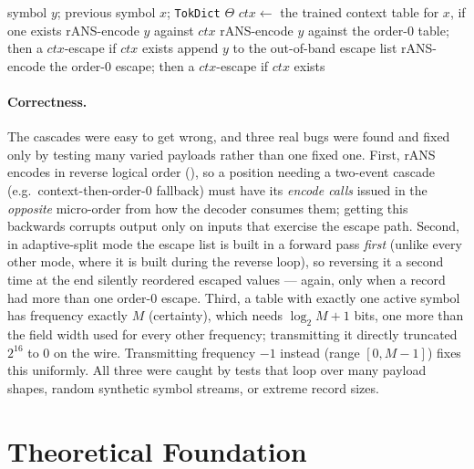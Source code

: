 \documentclass[10pt,twocolumn]{article}
\theoremstyle{plain}
\theoremstyle{definition}
\begin{document}
\begin{algorithm}[t]
\caption{\texttt{TokDict} order-1 $\to$ order-0 $\to$ escape cascade (encode one symbol)}
\label{alg:tokdict-cascade}
\begin{algorithmic}[1]
\Require symbol $y$; previous symbol $x$; \texttt{TokDict} $\Theta$
\State $ctx \gets$ the trained context table for $x$, if one exists
    \State rANS-encode $y$ against $ctx$ 
    \State rANS-encode $y$ against the order-0 table; then a $ctx$-escape if $ctx$ exists
\Else
    \State append $y$ to the out-of-band escape list
    \State rANS-encode the order-0 escape; then a $ctx$-escape if $ctx$ exists
\EndIf
\State {}
\end{algorithmic}
\end{algorithm}

\paragraph{Correctness.} The cascades were easy to get wrong, and three real bugs
were found and fixed only by testing many varied payloads rather than one fixed one.
First, rANS encodes in reverse logical order (), so a position needing
a two-event cascade (e.g.\ context-then-order-0 fallback) must have its \emph{encode
calls} issued in the \emph{opposite} micro-order from how the decoder consumes them;
getting this backwards corrupts output only on inputs that exercise the escape path.
Second, in adaptive-split mode the escape list is built in a forward pass \emph{first}
(unlike every other mode, where it is built during the reverse loop), so reversing it
a second time at the end silently reordered escaped values --- again, only when a
record had more than one order-0 escape. Third, a table with exactly one active symbol
has frequency exactly $M$ (certainty), which needs $\log_2 M + 1$ bits, one more than
the field width used for every other frequency; transmitting it directly truncated
$2^{16}$ to $0$ on the wire. Transmitting frequency $-1$ instead (range
$[0, M{-}1]$) fixes this uniformly. All three were caught by tests that loop over many
payload shapes, random synthetic symbol streams, or extreme record sizes.

\section{Theoretical Foundation}\label{sec:theory}
\end{document}

